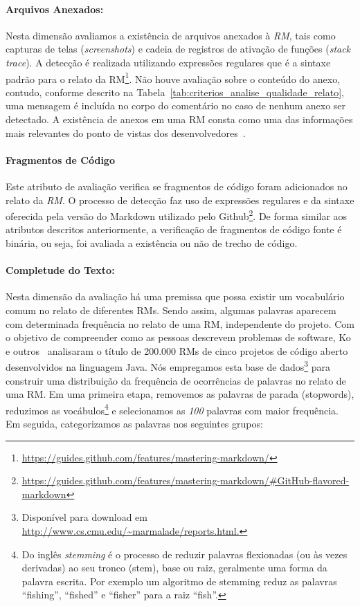 \paragraph{Arquivos Anexados:}
\label{par:arquivos_anexados}

Nesta dimensão avaliamos a existência de arquivos anexados à \textit{RM}, tais
como capturas de telas (\textit{screenshots}) e cadeia de registros de ativação
de funções (\textit{stack trace}). A detecção é realizada utilizando expressões
regulares que é a sintaxe padrão para o relato da
RM\footnote{\url{https://guides.github.com/features/mastering-markdown/}}. Não
houve avaliação sobre o conteúdo do anexo, contudo, conforme descrito na
Tabela~\ref{tab:criterios_analise_qualidade_relato}, uma mensagem é incluída no
corpo do comentário no caso de nenhum anexo ser detectado. A existência de
anexos em uma RM consta como uma das informações mais relevantes do ponto de
vistas dos desenvolvedores~\cite{zimmermann2010makes}.

\paragraph{Fragmentos de Código}
\label{par:fragmentos_de_código}

Este atributo de avaliação verifica se fragmentos de código foram adicionados
no relato da \textit{RM}. O processo de detecção faz uso de expressões
regulares e da sintaxe oferecida pela versão do Markdown utilizado pelo
Github\footnote{\url{https://guides.github.com/features/mastering-markdown/\#GitHub-flavored-markdown}}.
De forma similar aos atributos descritos anteriormente, a verificação de
fragmentos de código fonte é binária, ou seja, foi avaliada a existência ou não
de trecho de código.

\paragraph{Completude do Texto:}
\label{par:completude_de_palavras_chaves}

Nesta dimensão da avaliação há uma premissa que possa existir um vocabulário
comum no relato de diferentes RMs. Sendo assim, algumas palavras aparecem com
determinada frequência no relato de uma RM, independente do projeto. Com o
objetivo de compreender como as pessoas descrevem problemas de software, Ko e
outros~\cite{ko2006linguistic} analisaram o título de 200.000 RMs de cinco
projetos de código aberto desenvolvidos na linguagem Java. Nós empregamos esta
base de dados\footnote{Disponível para download em
    \url{http://www.cs.cmu.edu/~marmalade/reports.html.}} para construir uma
distribuição da frequência de ocorrências de palavras no relato de uma RM\@.  Em
uma primeira etapa, removemos as palavras de parada (stopwords), reduzimos as
vocábulos\footnote{Do inglês \textit{stemming} é o processo de reduzir palavras
    flexionadas (ou às vezes derivadas) ao seu tronco (stem), base ou raiz,
    geralmente uma forma da palavra escrita. Por exemplo um algoritmo de
    stemming reduz as palavras ``fishing'', ``fished'' e ``fisher'' para a raiz
    ``fish''.} e selecionamos as \textit{100} palavras com maior frequência. Em
seguida, categorizamos as palavras nos seguintes grupos:

